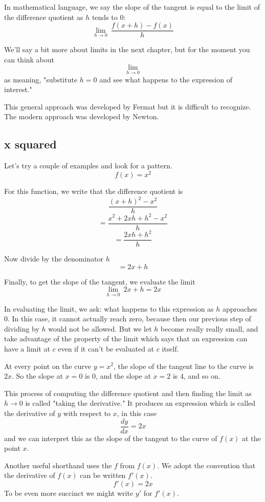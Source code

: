 \documentclass[11pt, oneside]{article}
\begin{document}
In mathematical language, we say the slope of the tangent is equal to the limit of the difference quotient as $h$ tends to $0$:
\[  \lim_{h \to 0} \  \frac{f(x+h) - f(x)}{h} \]

We'll say a bit more about limits in the next chapter, but for the moment you can think about 
\[  \lim_{h \to 0} \]
as meaning, "substitute $h=0$ and see what happens to the expression of interest."

This general approach was developed by Fermat but it is difficult to recognize.  The modern approach was developed by Newton.

\subsection*{x squared}

Let's try a couple of examples and look for a pattern.
\[    f(x)=x^2  \]

For this function, we write that the difference quotient is
\[    \frac{(x+h)^2 - x^2}{h} \]
\[    = \frac{x^2 + 2xh + h^2 - x^2}{h} \]
\[    = \frac{2xh + h^2}{h} \]

Now divide by the denominator $h$
\[    = 2x + h \]
    
Finally, to get the slope of the tangent, we evaluate the limit
\[    \lim_{h \to 0} \  2x + h = 2x \]

In evaluating the limit, we ask:  what happens to this expression as $h$ approaches $0$.  In this case, it cannot actually reach zero, because then our previous step of dividing by $h$ would not be allowed.  But we let $h$ become really really small, and take advantage of the property of the limit which says that an expression can have a limit at $c$ even if it can't be evaluated at $c$ itself.

At every point on the curve $y=x^2$, the slope of the tangent line to the curve is $2x$.  So the slope at $x=0$ is $0$, and the slope at $x=2$ is $4$, and so on.

This process of computing the difference quotient and then finding the limit as $h \to 0$ is called "taking the derivative."  It produces an expression which is called the derivative of $y$ with respect to $x$, in this case
\[   \frac{dy}{dx} = 2x \]
and we can interpret this as the slope of the tangent to the curve of $f(x)$ at the point $x$.

Another useful shorthand uses the $f$ from $f(x)$.  We adopt the convention that the derivative of $f(x)$ can be written $f'(x)$.
\[    f'(x) = 2x \]
To be even more succinct we might write $y'$ for $f'(x)$.
\end{document}
